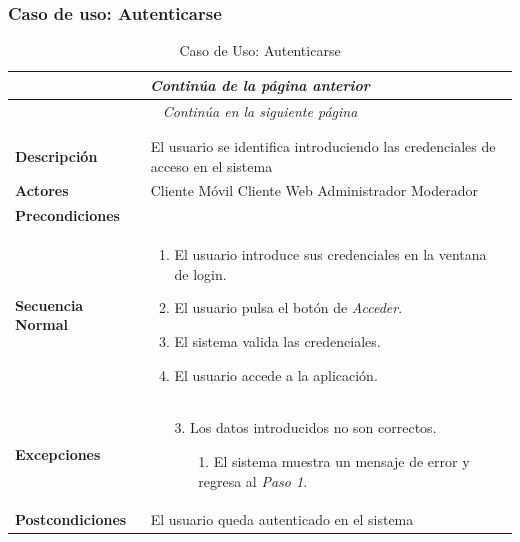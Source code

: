 \subsubsection*{Caso de uso: Autenticarse}
\begin{longtable}{| p{4cm} | p{10cm} |}
\endfirsthead
\multicolumn{2}{c}{\textit{Continúa de la página anterior}}\\[12pt]
\hline
\endhead
\hline
\multicolumn{2}{c}{\textit{Continúa en la siguiente página}} \\
\endfoot
\hline
\caption{Caso de Uso: Autenticarse}\label{fig:1}\\
\endlastfoot


\hline
\multicolumn{2}{|c|}{\textbf{CU$<$01$>$ - Autenticarse}} \\

\hline
\textbf{Descripción} &
El usuario se identifica introduciendo las credenciales de acceso en el sistema \\

\hline
\textbf{Actores} &
Cliente Móvil\newline
Cliente Web\newline
Administrador\newline
Moderador\\

\hline
\textbf{Precondiciones} &
\\

\hline
\textbf{Secuencia Normal} &\mbox{}\par\vspace{-\baselineskip}
\begin{enumerate}[leftmargin=0.7cm, topsep=0.1cm]
\item El usuario introduce sus credenciales en la ventana de login. 
\item El usuario pulsa el botón de \textit{Acceder}.
\item El sistema valida las credenciales.
\item El usuario accede a la aplicación.
\end{enumerate}\\

\hline
\textbf{Excepciones} &\mbox{}\par\vspace{-\baselineskip}
\begin{enumerate}[leftmargin=0.9cm, topsep=0.1cm]
\item[3.] Los datos introducidos no son correctos.
	\begin{itemize}
	\item[1.] El sistema muestra un mensaje de error y regresa al \textit{Paso 1}.
	\end{itemize}

\end{enumerate}\\

\hline
\textbf{Postcondiciones} & 
El usuario queda autenticado en el sistema\\
\hline
\end{longtable}




